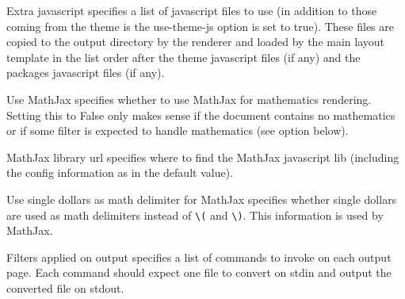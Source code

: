 \begin{configuration}{Extra javascript}
specifies a list of javascript files to use (in addition
to those coming from the theme is the use-theme-js option is set to true).
These files are copied to the output directory by the
renderer and loaded by the main layout template in the list order after
the theme javascript files (if any) and the packages javascript files (if any).
\end{configuration}

\begin{configuration}{Use MathJax}
specifies whether to use MathJax for mathematics rendering. Setting this
to False only makes sense if the document contains no mathematics or if
some filter is expected to handle mathematics (see
 option below).
\end{configuration}

\begin{configuration}{MathJax library url}
specifies where to find the MathJax javascript lib (including the config
information as in the default value).
\end{configuration}

\begin{configuration}{Use single dollars as math delimiter for MathJax}
specifies whether single dollars are used as math delimiters instead of
\verb+\(+ and \verb+\)+. This information is used by MathJax.
\end{configuration}


\begin{configuration}{Filters applied on output}
specifies a list of commands to invoke on each output
page. Each command should expect one file to convert on stdin and output
the converted file on stdout.
\end{configuration}

